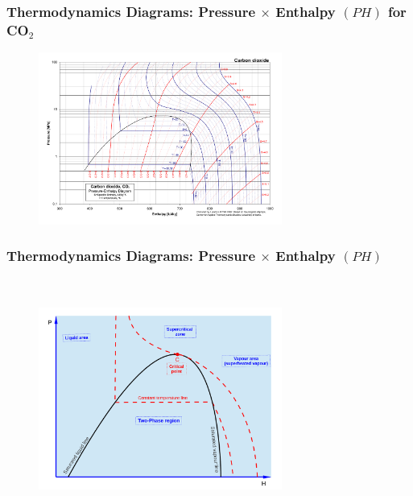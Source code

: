 \documentclass[10pt,compress,handout,ignorenonframetext]{beamer}
\begin{document}
\begin{frame}
 \frametitle{Thermodynamics Diagrams: Pressure $\times$ Enthalpy $(PH)$ for CO$_{2}$}
  \begin{center}
   \begin{figure}
     \includegraphics[width=8cm,height=7.cm,clip]{./Pics/CO2col}
   \end{figure}
   \end{center}
\end{frame}

\begin{frame}
 \frametitle{Thermodynamics Diagrams: Pressure $\times$ Enthalpy $(PH)$}
  \begin{center}
   \begin{figure}
      \includegraphics[width=8cm,height=7.9cm,clip]{./Pics/Overview_Refrig18}
   \end{figure}
   \end{center}
\end{frame}
\end{document}
